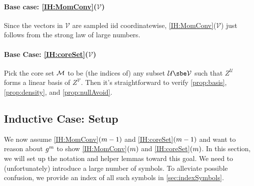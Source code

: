 \documentclass[main.tex]{subfiles}
\begin{document}
\paragraph{Base case: \ref{IH:MomConv}($\mathcal V$)}
Since the vectors in $\mathcal V$ are sampled iid coordinatewise, \ref{IH:MomConv}($\mathcal V$) just follows from the strong law of large numbers.

\paragraph{Base Case: \ref{IH:coreSet}($\mathcal V$)}
Pick the core set $\mathcal{M}$ to be (the indices of) any subset $\mathcal U \sbe \mathcal V$ such that $Z^{\mathcal U}$ forms a linear basis of $Z^{\mathcal V}$.
Then it's straightforward to verify \ref{prop:basis}, \ref{prop:density}, and \ref{prop:nullAvoid}.

\subsection{Inductive Case: Setup}
\label{sec:inductiveSetup}

We now assume \ref{IH:MomConv}$(m-1)$ and \ref{IH:coreSet}$(m-1)$ and want to reason about $g^m$ to show \ref{IH:MomConv}$(m)$ and \ref{IH:coreSet}$(m)$.
In this section, we will set up the notation and helper lemmas toward this goal. 
We need to (unfortunately) introduce a large number of symbols.
To alleviate possible confusion, we provide an index of all such symbols in \cref{sec:indexSymbols}.
\end{document}
